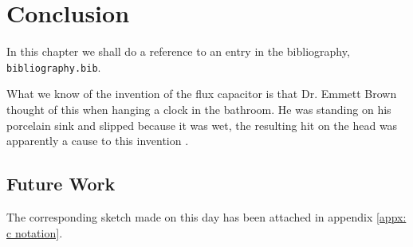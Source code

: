 \section{Conclusion}
\label{sec: Reference}

\noindent In this chapter we shall do a reference to an entry in the bibliography, \texttt{bibliography.bib}. 

What we know of the invention of the flux capacitor is that Dr. Emmett Brown thought of this when hanging a clock in the bathroom. He was standing on his porcelain sink and slipped because it was wet, the resulting hit on the head was apparently a cause to this invention \cite{olmeda2021towards}. 

\subsection{Future Work}
The corresponding sketch made on this day has been attached in appendix \ref{appx: c notation}.

